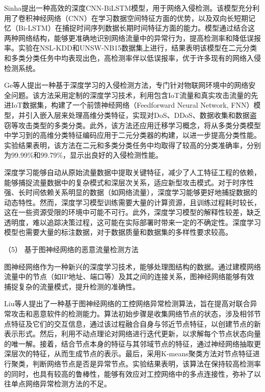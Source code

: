 \documentclass[promaster]{thesis-uestc}
\begin{document}
Sinha提出一种高效的深度CNN-BiLSTM模型，用于网络入侵检测。该模型充分利用了卷积神经网络（CNN）在学习数据空间特征方面的优势，以及双向长短期记忆（Bi-LSTM）在捕捉时间序列数据长期时间特征方面的能力。模型通过结合这两种网络结构，能够更准确地识别网络流量中的异常行为，提高检测率和降低误报率。实验在NSL-KDD和UNSW-NB15数据集上进行，结果表明该模型在二元分类和多类分类任务中均表现出色，高检测率伴以低误报率，优于许多现有的网络入侵检测系统。

Ge等人提出一种基于深度学习的入侵检测方法，专门针对物联网环境中的网络安全问题。该方法采用定制的深度学习技术，利用包含IoT流量和真实攻击流量的先进IoT数据集，构建了一个前馈神经网络（Feedforward Neural Network, FNN）模型，并引入嵌入层来处理高维分类特征，实现对DoS、DDoS、数据收集和数据盗窃等攻击类型的多类分类。此外，该方法还应用迁移学习概念，将从多类分类模型中学习到的高维分类特征编码应用于二元分类器的构建，以进一步提高分类性能。实验结果表明，该方法在二元和多类分类任务中均取得了较高的分类准确率，分别为99.99\%和99.79\%，显示出良好的入侵检测性能。

深度学习能够自动从原始流量数据中提取关键特征，减少了人工特征工程的依赖，能够捕捉流量数据中的复杂模式和深层次关系，适应新型攻击模式。对于时序性强、长时间依赖关系明显的数据（如网络流量），深度学习能够更好地捕捉数据的动态特性。然而，深度学习模型训练需要大量的计算资源，且训练过程耗时较长，这在一些资源受限的环境中可能不可行。此外，深度学习模型的解释性较差，缺乏透明度，难以追踪决策过程，这可能在实际部署时带来一定的不确定性。深度学习模型也需要大量的标注数据，对于数据质量和数据集的多样性要求较高。

（5） 基于图神经网络的恶意流量检测方法  

图神经网络作为一种新兴的深度学习技术，能够处理图结构的数据。通过建模网络流量中的节点（如IP地址、端口等）及其之间的连接关系，图神经网络能够有效捕捉复杂的流量模式，提升检测的准确性。

Liu等人提出了一种基于图神经网络的工控网络异常检测算法，旨在提高对联合异常攻击和恶意软件的检测能力。算法初始步骤是收集网络节点的状态，涉及相邻节点特征及它们的交互信息，通过该过程融合自身与邻近节点特征，以创建节点的新表示形式。然后，利用不动点理论对网络进行迭代更新，以求解每个节点状态向量的唯一解。接着，结合节点本身的特征与其邻域节点的特征，通过神经网络抽取更深层次的特征，从而生成节点的表示。最后，采用K-means聚类方法对节点特征进行聚类，判断网络节点是否是异常节点。实验结果表明，该算法在保持较高检测率的同时，也具有较高的鲁棒性，能够有效应对工控网络中的多点连接性，弥补了以往单点网络异常检测方法的不足。
\end{document}
